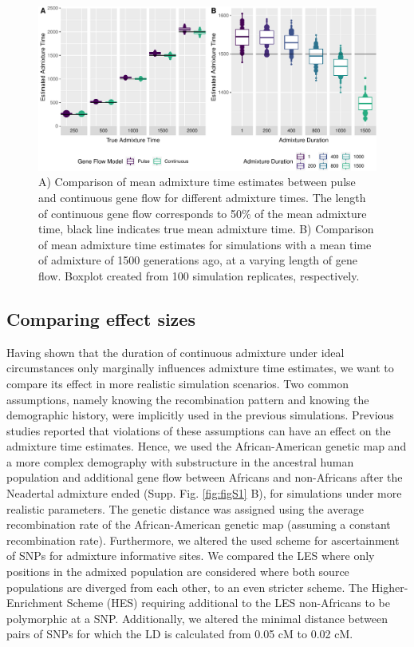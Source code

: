 \documentclass[]{article}
\begin{document}
\begin{figure}
\centering
\includegraphics{Admixture_Time_Inference_Paper_Draft_files/figure-latex/fig2-1.pdf}
\caption{\label{fig:fig2} A) Comparison of mean admixture time estimates
between pulse and continuous gene flow for different admixture times.
The length of continuous gene flow corresponds to 50\% of the mean
admixture time, black line indicates true mean admixture time. B)
Comparison of mean admixture time estimates for simulations with a mean
time of admixture of 1500 generations ago, at a varying length of gene
flow. Boxplot created from 100 simulation replicates, respectively.}
\end{figure}
\subsection{Comparing effect sizes}\label{comparing effect sizes}

Having shown that the duration of continuous admixture under ideal
circumstances only marginally influences admixture time
estimates, we want to compare its effect in more realistic simulation scenarios. Two common assumptions, namely knowing the recombination pattern and knowing the demographic history, were implicitly used in the previous simulations.
Previous studies reported that violations of these assumptions can have an effect on the admixture time estimates.
Hence, we used the African-American genetic map and a more complex demography with substructure in the ancestral human population and additional gene flow between Africans and non-Africans after the Neadertal admixture ended (Supp. Fig. \ref{fig:figS1} B), for simulations under more realistic parameters. The genetic distance was assigned using the average recombination rate of the African-American genetic map (assuming a constant recombination rate).
Furthermore, we altered the used scheme for ascertainment of SNPs for admixture informative sites. We compared the LES where only
positions in the admixed population are considered where both source
populations are diverged from each other, to an even stricter scheme. The Higher-Enrichment Scheme (HES) requiring additional
to the LES non-Africans to be polymorphic at a SNP. Additionally, we altered the minimal distance between pairs of SNPs for which the LD is calculated from 0.05 cM to 0.02 cM.
\end{document}
